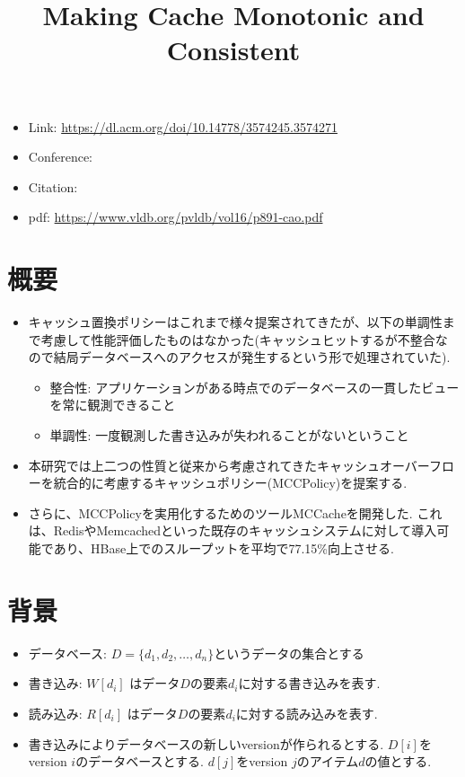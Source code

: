 \documentclass[dvipdfmx,uplatex]{jsarticle}
\title{Making Cache Monotonic and Consistent}
\author{\empty}
\date{\empty}
\theoremstyle{remark}
\newenvironment{simplebox}{
    \begin{tcolorbox}[
        fonttitle=\bfseries,
    ]
}{
    \end{tcolorbox}
}
\begin{document}
\maketitle

\begin{itemize}
    \item Link: \url{https://dl.acm.org/doi/10.14778/3574245.3574271}
    \item Conference:
    \item Citation: \cite{cache-consistent}
    \item pdf: \url{https://www.vldb.org/pvldb/vol16/p891-cao.pdf}
\end{itemize}


\section{概要}
\begin{simplebox}
\begin{itemize}
    \item キャッシュ置換ポリシーはこれまで様々提案されてきたが、以下の単調性まで考慮して性能評価したものはなかった(キャッシュヒットするが不整合なので結局データベースへのアクセスが発生するという形で処理されていた).
    \begin{itemize}
        \item 整合性: アプリケーションがある時点でのデータベースの一貫したビューを常に観測できること
        \item 単調性: 一度観測した書き込みが失われることがないということ
    \end{itemize}
    \item 本研究では上二つの性質と従来から考慮されてきたキャッシュオーバーフローを統合的に考慮するキャッシュポリシー(MCCPolicy)を提案する.
    \item さらに、MCCPolicyを実用化するためのツールMCCacheを開発した. これは、RedisやMemcachedといった既存のキャッシュシステムに対して導入可能であり、HBase上でのスループットを平均で77.15\%向上させる.
\end{itemize}
\end{simplebox}

\section{背景}
\begin{simplebox}
\begin{itemize}
    \item データベース: $D = \{d_1, d_2, \dots, d_n\}$というデータの集合とする
    \item 書き込み: $W[d_i]$ はデータ$D$の要素$d_i$に対する書き込みを表す.
    \item 読み込み: $R[d_i]$ はデータ$D$の要素$d_i$に対する読み込みを表す.
    \item 書き込みによりデータベースの新しいversionが作られるとする. $D[i]$をversion $i$のデータベースとする. $d[j]$をversion $j$のアイテム$d$の値とする.
\end{itemize}
\end{simplebox}
\end{document}

